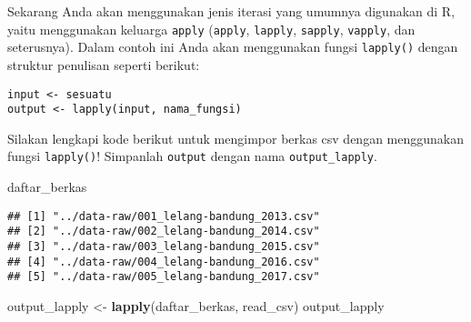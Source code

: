 \documentclass[]{article}
\newenvironment{Shaded}{\begin{snugshade}}{\end{snugshade}}
\newcommand{\KeywordTok}[1]{\textcolor[rgb]{0.13,0.29,0.53}{\textbf{#1}}}
\newcommand{\NormalTok}[1]{#1}
\newcommand{\StringTok}[1]{\textcolor[rgb]{0.31,0.60,0.02}{#1}}
\begin{document}
Sekarang Anda akan menggunakan jenis iterasi yang umumnya digunakan di
R, yaitu menggunakan keluarga \texttt{apply} (\texttt{apply},
\texttt{lapply}, \texttt{sapply}, \texttt{vapply}, dan seterusnya).
Dalam contoh ini Anda akan menggunakan fungsi \texttt{lapply()} dengan
struktur penulisan seperti berikut:

\begin{verbatim}
input <- sesuatu
output <- lapply(input, nama_fungsi)
\end{verbatim}

Silakan lengkapi kode berikut untuk mengimpor berkas csv dengan
menggunakan fungsi \texttt{lapply()}! Simpanlah \texttt{output} dengan
nama \texttt{output\_lapply}.

\begin{Shaded}
\begin{Highlighting}[]
\NormalTok{daftar_berkas}
\end{Highlighting}
\end{Shaded}

\begin{verbatim}
## [1] "../data-raw/001_lelang-bandung_2013.csv"
## [2] "../data-raw/002_lelang-bandung_2014.csv"
## [3] "../data-raw/003_lelang-bandung_2015.csv"
## [4] "../data-raw/004_lelang-bandung_2016.csv"
## [5] "../data-raw/005_lelang-bandung_2017.csv"
\end{verbatim}

\begin{Shaded}
\begin{Highlighting}[]
\NormalTok{output_lapply <-}\StringTok{ }\KeywordTok{lapply}\NormalTok{(daftar_berkas, read_csv)}
\NormalTok{output_lapply}
\end{Highlighting}
\end{Shaded}
\end{document}
